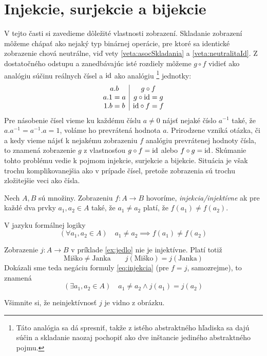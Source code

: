 \section{Injekcie, surjekcie a bijekcie}

V tejto časti si zavedieme dôležité vlastnosti zobrazení. Skladanie zobrazení
môžeme chápať ako nejaký typ binárnej operácie, pre ktoré sa identické zobrazenie chová neutrálne, viď
vety \ref{veta:asocSkladania} a \ref{veta:neutralitaId}.
Z dostatočného odstupu a zanedbávajúc isté rozdiely môžeme $g\circ f$ vidieť ako analógiu súčinu reálnych čísel a $\mathrm{id}$ ako analógiu
\footnote{Táto analógia sa dá spresniť, takže z istého abstraktného hľadiska sa dajú súčin a skladanie
naozaj pochopiť ako dve inštancie jediného abstraktného pojmu.}
jednotky:
\[
\begin{array}{c|c}
a.b & g\circ f\\
a.1 =a &  g\circ\mathrm{id}=g \\
1.b=b & \mathrm{id}\circ f= f
\end{array}
\]
Pre násobenie čísel vieme ku každému číslu $a\neq 0$ nájsť nejaké číslo $a^{-1}$ také, že $a.a^{-1}=a^{-1}.a=1$, voláme ho
prevrátená hodnota $a$. Prirodzene vzniká otázka, či a kedy vieme nájsť k nejakému zobrazeniu $f$ analógiu prevrátenej
hodnoty čísla, to znamená zobrazenie $g$ z vlastnosťou $g \circ f=\mathrm{id}$ alebo $f\circ g=\mathrm{id}$. Skúmanie tohto
problému vedie k pojmom injekcie, surjekcie a bijekcie. Situácia je však trochu komplikovanejšia ako v prípade čísel,
pretože zobrazenia sú trochu zložitejšie veci ako čísla. 

\begin{definition}[injekcia]\label{def:injekcia}
Nech $A,B$ sú množiny. Zobrazeniu $f\colon A\to B$ hovoríme,
\emph{injekcia/injektívne} ak pre každé dva prvky $a_1,a_2\in A$ také, že $a_1\neq a_2$ platí, že $f(a_1)\neq f(a_2)$.
\end{definition}

V jazyku formálnej logiky
\begin{equation}\label{eq:injekcia}
(\forall a_1,a_2\in A)\quad a_1\neq a_2\implies f(a_1)\neq f(a_2)
\end{equation}
\begin{example}
Zobrazenie $j\colon A\to B$ v príklade \ref{ex:jedlo} nie je injektívne. Platí totiž
\[
\text{Miško}\neq\text{Janka}\qquad j(\text{Miško})=j(\text{Janka})
\]
Dokázali sme teda negáciu formuly \eqref{eq:injekcia} (pre $f=j$, samozrejme), to znamená
\[
(\exists a_1,a_2\in A)\quad a_1\neq a_2\land j(a_1)=j(a_2)
\]
\end{example}
Všimnite si, že neinjektívnosť $j$ je vidno z obrázku.


